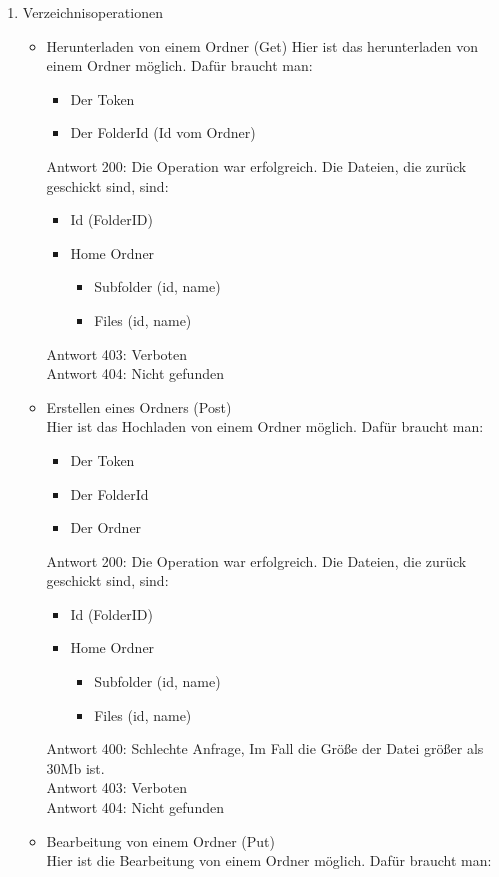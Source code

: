 \begin{enumerate}
\item Verzeichnisoperationen
\begin{itemize}
\item Herunterladen von einem Ordner (Get)
Hier ist das herunterladen von einem Ordner m\"oglich. Daf\"ur braucht man: 
\begin{itemize}
\item Der Token
\item Der FolderId (Id vom Ordner) 
\end{itemize}
Antwort 200: Die Operation war erfolgreich. Die Dateien, die zur\"uck geschickt sind, sind:
\begin{itemize}
\item Id (FolderID)
\item Home Ordner
	\begin{itemize}
	\item Subfolder (id, name)
	\item Files (id, name)
	\end{itemize}
\end{itemize} 
Antwort 403: Verboten \\
Antwort 404: Nicht gefunden
\item Erstellen eines Ordners (Post) \\
Hier ist das Hochladen von einem Ordner m\"oglich. Daf\"ur braucht man:
\begin{itemize}
\item Der Token
\item Der FolderId 
\item Der Ordner 
\end{itemize}
Antwort 200: Die Operation war erfolgreich. Die Dateien, die zur\"uck geschickt sind, sind:
\begin{itemize}
\item Id (FolderID)
\item Home Ordner
	\begin{itemize}
	\item Subfolder (id, name)
	\item Files (id, name)
	\end{itemize}
\end{itemize}
Antwort 400: Schlechte Anfrage, Im Fall die Gr\"o{\ss}e der Datei gr\"o{\ss}er als 30Mb ist. \\
Antwort 403: Verboten \\
Antwort 404: Nicht gefunden
\item Bearbeitung von einem Ordner (Put) \\
Hier ist die Bearbeitung von einem Ordner m\"oglich. Daf\"ur braucht man: 

\end{itemize}
\end{enumerate}
